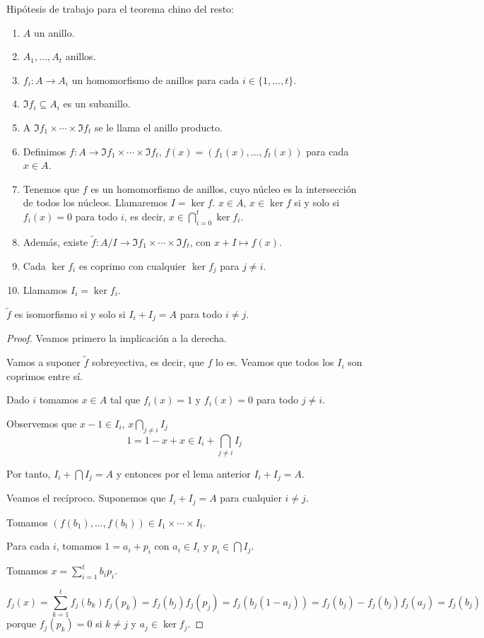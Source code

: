   Hipótesis de trabajo para el teorema chino del resto:
  \begin{enumerate}
    \item \(A\) un anillo.
    \item \(A_1,\ldots,A_t\) anillos.
    \item \(f_i:A\longrightarrow A_i\) un homomorfismo de anillos
      para cada \(i\in\{1,\ldots,t\}\).
    \item \(\Im f_i\subseteq A_i\) es un subanillo.
    \item A \(\Im f_1\times\cdots\times\Im f_t\) se le llama el anillo
      producto.
    \item Definimos \(f:A\longrightarrow\Im f_1\times\cdots\times\Im f_t\),
      \(f(x)=(f_1(x),\ldots,f_t(x))\) para cada \(x\in A\).
    \item Tenemos que \(f\) es un homomorfismo de anillos, cuyo núcleo es la
      intersección de todos los núcleos. Llamaremos \(I=\ker f\).
      \(x\in A\), \(x\in\ker f\) si y solo si \(f_i(x)=0\) para todo \(i\),
      es decir, \(x\in\bigcap_{i=0}^t \ker f_i\).
    \item  Además, existe \(\tilde{f}:A/I
      \longrightarrow\Im f_1\times\cdots\times\Im f_t\),
      con \(x+I\mapsto f(x)\).
    \item Cada \(\ker f_i\) es coprimo con cualquier \(\ker f_j\)
      para \(j\neq i\).
    \item Llamamos \(I_i=\ker f_i\).
  \end{enumerate}

\begin{teo}
  \(\tilde{f}\) es isomorfismo si y solo si
  \(I_i+I_j=A\) para todo \(i\neq j\).
\end{teo}
\begin{proof}
  Veamos primero la implicación a la derecha.

  Vamos a suponer \(\tilde{f}\) sobreyectiva, es decir, que \(f\) lo es.
  Veamos que todos los \(I_i\) son coprimos entre sí.

  Dado \(i\) tomamos \(x\in A\) tal que \(f_i(x)=1\) y
  \(f_i(x)=0\) para todo \(j\neq i\).

  Observemos que \(x-1\in I_i\), \(x\bigcap_{j\neq i} I_j\)
  \[
    1=1-x+x\in I_i+\bigcap_{j\neq i} I_j
  \]

  Por tanto, \(I_i+\bigcap I_j =A\) y entonces por el lema anterior
  \(I_i+I_j=A\).

  Veamos el recíproco.
  Suponemos que \(I_i+I_j=A\) para cualquier \(i\neq j\).

  Tomamos \((f(b_1),\ldots,f(b_t))\in I_1\times\cdots\times I_t\).

  Para cada \(i\), tomamos
  \(
  1=a_i+p_i\) con \(a_i\in I_i\) y \(p_i\in\bigcap I_j\).

  Tomamos \(x=\sum_{i=1}^t b_i p_i\).

  \[
    f_j(x)=\sum_{k=1}^t f_j(b_k) f_j(p_k)=f_j(b_j)f_j(p_j)=f_j(b_j(1-a_j))
    =f_j(b_j)-f_j(b_j)f_j(a_j)=f_j(b_j)
  \]
  porque \(f_j(p_k)=0\) si \(k\neq j\) y \(a_j\in\ker f_j\).

\end{proof}
